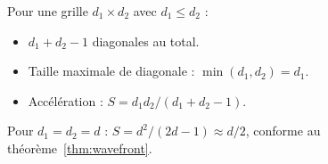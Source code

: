 \documentclass[10pt,onecolumn]{article}
\begin{document}
Pour une grille $d_1 \times d_2$ avec $d_1 \leq d_2$ :
\begin{itemize}
  \item $d_1 + d_2 - 1$ diagonales au total.
  \item Taille maximale de diagonale : $\min(d_1, d_2) = d_1$.
  \item Accélération : $S = d_1 d_2 / (d_1 + d_2 - 1)$.
\end{itemize}
Pour $d_1 = d_2 = d$ : $S = d^2/(2d-1) \approx d/2$, conforme au théorème~\ref{thm:wavefront}.



\end{document}
